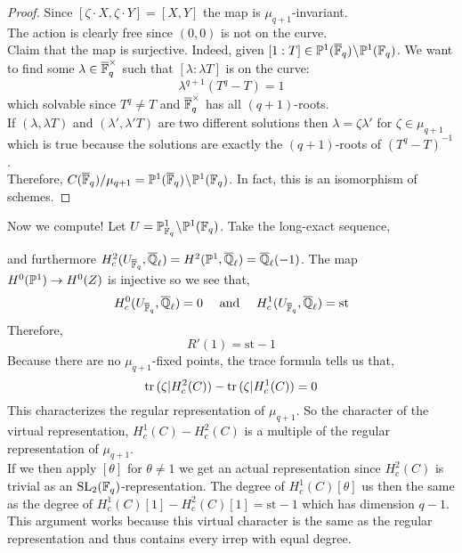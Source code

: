 \documentclass[12pt]{article}
\newcommand{\st}{\mathrm{st}}
\begin{document}
\begin{proof}
Since $[\zeta \cdot X, \zeta \cdot Y] = [X, Y]$ the map is $\mu_{q+1}$-invariant.
\bigskip\\
The action is clearly free since $(0, 0)$ is not on the curve.
\bigskip\\
Claim that the map is surjective. Indeed, given $[1 : T] \in \P^1(\FFbar_q) \sm \P^1(\FF_q)$. We want to find some $\lambda \in \FFbar_q^\times$ such that $[ \lambda : \lambda T]$ is on the curve:
\[ \lambda^{q+1} (T^q - T) = 1 \]
which solvable since $T^q \neq T$ and $\FFbar_q^\times$ has all $(q+1)$-roots. 
\bigskip\\
If $(\lambda, \lambda T)$ and $(\lambda', \lambda' T)$ are two different solutions then $\lambda = \zeta \lambda'$ for $\zeta \in \mu_{q+1}$ which is true because the solutions are exactly the $(q+1)$-roots of $(T^q - T)^{-1}$. 
\bigskip\\
Therefore, $C(\FFbar_q) / \mu_{q+1} = \P^1(\FFbar_q) \sm \P^1(\FF_q)$. In fact, this is an isomorphism of schemes. 
\end{proof}

Now we compute! Let $U = \P^1_{\FF_q} \sm \P^1(\FF_q)$. Take the long-exact sequence,
\begin{center}
\end{center} 
and furthermore $H^2_c(U_{\FFbar_q}, \Qbar_\ell) = H^2(\P^1, \Qbar_\ell) = \Qbar_\ell(-1)$. The map $H^0(\P^1) \to H^0(Z)$ is injective so we see that,
\[ H^0_c(U_{\FFbar_q}, \Qbar_\ell) = 0 \quad \text{ and } \quad H^1_c(U_{\FFbar_q}, \Qbar_\ell) = \text{st} \]
Therefore,
\[ R'(1) = \st - 1 \]
Because there are no $\mu_{q+1}$-fixed points, the trace formula tells us that,
\[ \tr{(\zeta | H^2_c(C))} - \tr{(\zeta | H^1_c(C))} = 0 \]
This characterizes the regular representation of $\mu_{q+1}$. So the character of the virtual representation, $H^1_c(C) - H^2_c(C)$ is a multiple of the regular representation of $\mu_{q+1}$.
\bigskip\\
If we then apply $[\theta]$ for $\theta \neq 1$ we get an actual representation since $H^2_c(C)$ is trivial as an $\SL_2(\FF_q)$-representation. The degree of $H^1_c(C)[\theta]$ us then the same as the degree of $H^1_c(C)[1] - H^2_c(C)[1] = \st - 1$ which has dimension $q-1$. This argument works because this virtual character is the same as the regular representation and thus contains every irrep with equal degree. 
\end{document}
